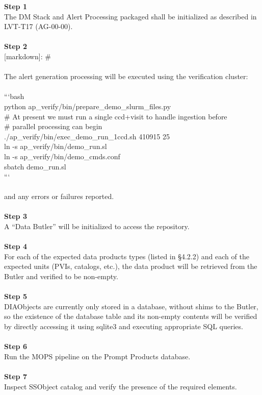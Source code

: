 \textbf{Step 1}\\
The DM Stack and Alert Processing packaged shall be initialized as
described in LVT-T17 (AG-00-00).\\
~\\
\textbf{Step 2}\\
{[}markdown{]}: \#\\
~\\
The alert generation processing will be executed using the verification
cluster:\\
~\\
```bash\\
python ap\_verify/bin/prepare\_demo\_slurm\_files.py\\
\# At present we must run a single ccd+visit to handle ingestion
before\\
\# parallel processing can begin\\
./ap\_verify/bin/exec\_demo\_run\_1ccd.sh 410915 25\\
ln -s ap\_verify/bin/demo\_run.sl\\
ln -s ap\_verify/bin/demo\_cmds.conf\\
sbatch demo\_run.sl\\
```\\
~\\
and any errors or failures reported.\\
~\\
\textbf{Step 3}\\
A ``Data Butler'' will be initialized to access the repository.\\
~\\
\textbf{Step 4}\\
For each of the expected data products types (listed in §4.2.2) and each
of the expected units (PVIs, catalogs, etc.), the data product will be
retrieved from the Butler and verified to be non-empty.\\
~\\
\textbf{Step 5}\\
DIAObjects are currently only stored in a database, without shims to the
Butler, so the existence of the database table and its non-empty
contents will be verified by directly accessing it using sqlite3 and
executing appropriate SQL queries.\\
~\\
\textbf{Step 6}\\
Run the MOPS pipeline on the Prompt Products database.\\
~\\
\textbf{Step 7}\\
Inspect SSObject catalog and verify the presence of the required
elements.\\
~\\

